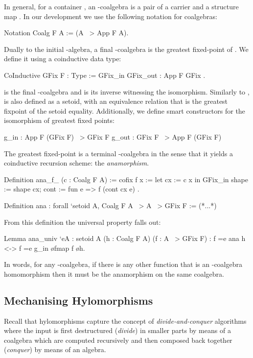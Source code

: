 \documentclass[a4paper,UKenglish,cleveref, autoref, thm-restate]{lipics-v2021}
\begin{document}
In general, for a container , an -coalgebra is a pair of a carrier
 and a structure map .  In our development we use the
following notation for coalgebras:
\begin{coqcode}
Notation Coalg F A := (A ~> App F A).
\end{coqcode}
Dually to the initial -algebra, a final -coalgebra is the greatest
fixed-point of . We define it using a coinductive data type:
\begin{coqcode}
CoInductive GFix F : Type := GFix_in { GFix_out : App F GFix }.
\end{coqcode}
 is the final -coalgebra and  is its
inverse witnessing the isomorphism. Similarly to ,  is also
defined as a setoid, with an equivalence relation that is the greatest fixpoint
of the  setoid equality. Additionally, we define smart constructors
for the isomorphism of greatest fixed points:
\begin{coqcode}
g_in : App F (GFix F) ~> GFix F          g_out : GFix F ~> App F (GFix F)
\end{coqcode}
The greatest fixed-point is a terminal -coalgebra in the sense that it
yields a coinductive recursion scheme: the \emph{anamorphism}.
\begin{coqcode}
Definition ana_f_ (c : Coalg F A) :=
  cofix f x := let cx := c x in
   GFix_in { shape := shape cx; cont := fun e => f (cont cx e) }.

Definition ana : forall `{setoid A}, Coalg F A ~> A ~> GFix F := (*...*)
\end{coqcode}
From this definition the universal property falls out:
\begin{coqcode}
Lemma ana_univ `{eA : setoid A} (h : Coalg F A) (f : A ~> GFix F)
: f =e ana h <-> f =e g_in \o fmap f \o h.
\end{coqcode}
In words, for any -coalgebra, if there is any other function  that
is an -coalgebra homomorphism then it must be the anamorphism on the same
coalgebra.

\subsection{Mechanising Hylomorphisms}
\label{sec:coq-rec-coalgebras}
Recall that hylomorphisms capture the concept of \emph{divide-and-conquer}
algorithms where the input is first destructured (\emph{divide}) in smaller
parts by means of a coalgebra which are computed recursively and then composed
back together (\emph{conquer}) by means of an algebra.
\end{document}
